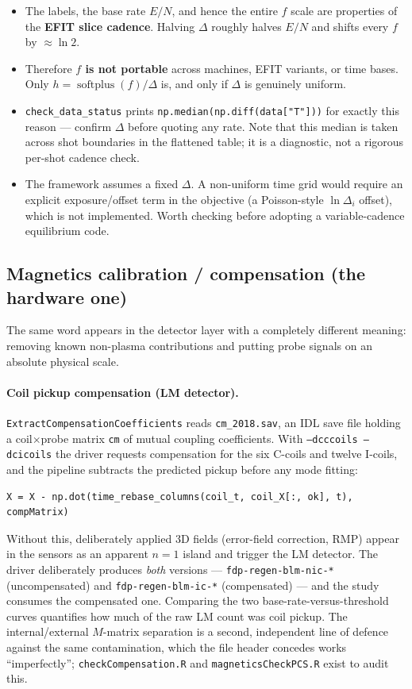 \documentclass[11pt,a4paper]{article}
\newcommand{\code}[1]{\texttt{\small #1}}
\newcommand{\softplus}{\operatorname{softplus}}
\begin{document}
\begin{itemize}[leftmargin=2em]
\item The labels, the base rate $E/N$, and hence the entire $f$ scale are properties of the
\textbf{EFIT slice cadence}. Halving $\Delta$ roughly halves $E/N$ and shifts every $f$ by
$\approx \ln 2$.
\item Therefore \textbf{$f$ is not portable} across machines, EFIT variants, or time bases. Only
$h = \softplus(f)/\Delta$ is, and only if $\Delta$ is genuinely uniform.
\item \code{check\_data\_status} prints \code{np.median(np.diff(data["T"]))} for exactly this
reason --- confirm $\Delta$ before quoting any rate. Note that this median is taken across shot
boundaries in the flattened table; it is a diagnostic, not a rigorous per-shot cadence check.
\item The framework assumes a fixed $\Delta$. A non-uniform time grid would require an explicit
exposure/offset term in the objective (a Poisson-style $\ln \Delta_i$ offset), which is not
implemented. Worth checking before adopting a variable-cadence equilibrium code.
\end{itemize}

\subsection{Magnetics calibration / compensation (the hardware one)}
\label{sec:magcalib}

The same word appears in the detector layer with a completely different meaning: removing known
non-plasma contributions and putting probe signals on an absolute physical scale.

\paragraph{Coil pickup compensation (LM detector).} \code{ExtractCompensationCoefficients} reads
\code{cm\_2018.sav}, an IDL save file holding a coil$\times$probe matrix \code{cm} of mutual coupling
coefficients. With \code{--dcccoils --dcicoils} the driver requests compensation for the six C-coils
and twelve I-coils, and the pipeline subtracts the predicted pickup before any mode fitting:
\begin{verbatim}
X = X - np.dot(time_rebase_columns(coil_t, coil_X[:, ok], t), compMatrix)
\end{verbatim}
Without this, deliberately applied 3D fields (error-field correction, RMP) appear in the sensors as
an apparent $n=1$ island and trigger the LM detector. The driver deliberately produces \emph{both}
versions --- \code{fdp-regen-blm-nic-*} (uncompensated) and \code{fdp-regen-blm-ic-*}
(compensated) --- and the study consumes the compensated one. Comparing the two base-rate-versus-threshold
curves quantifies how much of the raw LM count was coil pickup. The
internal/external $M$-matrix separation is a second, independent line of defence against the same
contamination, which the file header concedes works ``imperfectly''; \code{checkCompensation.R} and
\code{magneticsCheckPCS.R} exist to audit this.
\end{document}
